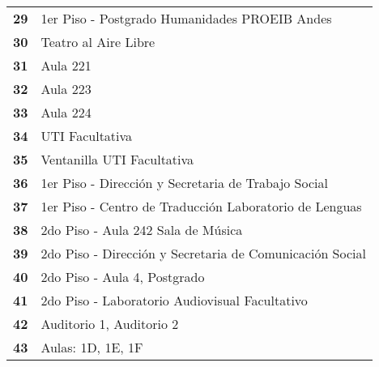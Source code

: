 \begin{longtable}{ c  X }
      \addlinespace
      \textbf{29}
      &
      1{\tiny er} Piso - Postgrado Humanidades PROEIB Andes
      \\

      \addlinespace
      \textbf{30}
      &
      Teatro al Aire Libre
      \\


      \addlinespace
      \textbf{31}
      &
      Aula 221
      \\

      \addlinespace
      \textbf{32}
      &
      Aula 223
      \\

      \addlinespace
      \textbf{33}
      &
      Aula 224
      \\

      \addlinespace
      \textbf{34}
      &
      UTI Facultativa
      \\

      \addlinespace
      \textbf{35}
      &
      Ventanilla UTI Facultativa
      \\


      \addlinespace
      \textbf{36}
      &
      1{\tiny er} Piso - Dirección y Secretaria de Trabajo Social
      \\

      \addlinespace
      \textbf{37}
      &
      1{\tiny er} Piso - Centro de Traducción Laboratorio de Lenguas
      \\

      \addlinespace
      \textbf{38}
      &
      2{\tiny do} Piso - Aula 242 Sala de Música
      \\

      \addlinespace
      \textbf{39}
      &
      2{\tiny do} Piso - Dirección y Secretaria de Comunicación Social
      \\

      \addlinespace
      \textbf{40}
      &
      2{\tiny do} Piso - Aula 4, Postgrado
      \\

      \addlinespace
      \textbf{41}
      &
      2{\tiny do} Piso - Laboratorio Audiovisual Facultativo
      \\

      \addlinespace
      \textbf{42}
      &
      Auditorio 1, Auditorio 2
      \\

      \addlinespace
      \textbf{43}
      &
      Aulas: 1D, 1E, 1F
      \\


\end{longtable}
